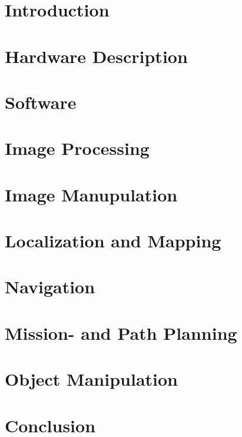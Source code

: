\documentclass[runningheads,a4paper]{llncs}
\begin{document}
\section{Introduction}


\section{Hardware Description}


\section{Software}


\section{Image Processing}


\section{Image Manupulation}


\section{Localization and Mapping}


\section{Navigation}


\section{Mission- and Path Planning}


\section{Object Manipulation}


\section{Conclusion}

\end{document}
